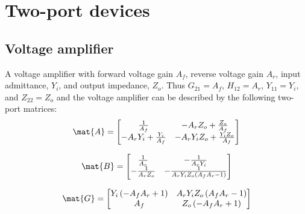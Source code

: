 \documentclass[a4paper, 12pt]{article}
\begin{document}




\section{Two-port devices}


\subsection{Voltage amplifier}

A voltage amplifier with forward voltage gain $A_f$, reverse voltage
gain $A_r$, input admittance, $Y_i$, and output impedance, $Z_o$.
Thus $G_{21} = A_f$, $H_{12} = A_r$, $Y_{11} = Y_i$, and $Z_{22} =
Z_o$ and the voltage amplifier can be described by the following
two-port matrices:
%
\begin{equation}
\mat{A} = \left[\begin{matrix}\frac{1}{A_{f}} & - A_{r} Z_{o} + \frac{Z_{o}}{A_{f}}\\- A_{r} Y_{i} + \frac{Y_{i}}{A_{f}} & - A_{r} Y_{i} Z_{o} + \frac{Y_{i} Z_{o}}{A_{f}}\end{matrix}\right]
\end{equation}

\begin{equation}
\mat{B} = \left[\begin{matrix}\frac{1}{A_{r}} & - \frac{1}{A_{r} Y_{i}}\\- \frac{1}{A_{r} Z_{o}} & - \frac{1}{A_{r} Y_{i} Z_{o} \left(A_{f} A_{r} - 1\right)}\end{matrix}\right]
\end{equation}

\begin{equation}
\mat{G} = \left[\begin{matrix}Y_{i} \left(- A_{f} A_{r} + 1\right) & A_{r} Y_{i} Z_{o} \left(A_{f} A_{r} - 1\right)\\A_{f} & Z_{o} \left(- A_{f} A_{r} + 1\right)\end{matrix}\right]
\end{equation}
\end{document}
